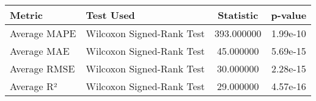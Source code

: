 \begin{tabular}{|l|l|c|c|}
\toprule
Metric & Test Used & Statistic & p-value \\
\midrule
Average MAPE & Wilcoxon Signed-Rank Test & 393.000000 & 1.99e-10 \\
Average MAE & Wilcoxon Signed-Rank Test & 45.000000 & 5.69e-15 \\
Average RMSE & Wilcoxon Signed-Rank Test & 30.000000 & 2.28e-15 \\
Average R² & Wilcoxon Signed-Rank Test & 29.000000 & 4.57e-16 \\
\bottomrule
\end{tabular}
